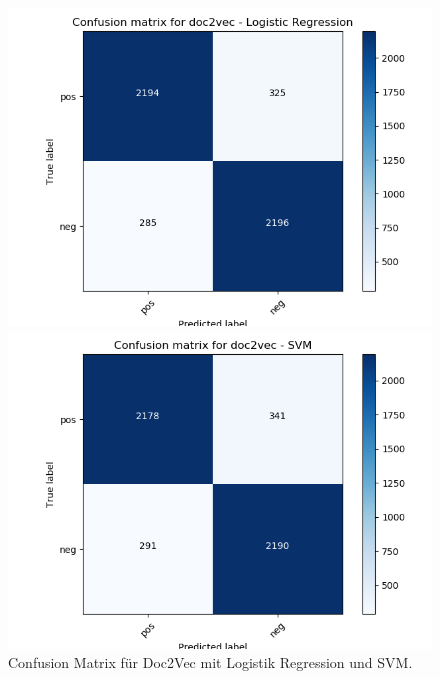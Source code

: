 \documentclass[12pt]{scrartcl}
\begin{document}
    \begin{figure}[h]
        \begin{minipage}{0.45\textwidth}
            \includegraphics[scale=.35]{pictures/doc2vec.png}
        \end{minipage}
        \hfill
        \begin{minipage}{0.45\textwidth}
            \includegraphics[scale=.35]{pictures/doc2vec_SVC.png}
        \end{minipage}
        \caption{Confusion Matrix für Doc2Vec mit Logistik Regression und SVM.}
    \end{figure}
\end{document}
